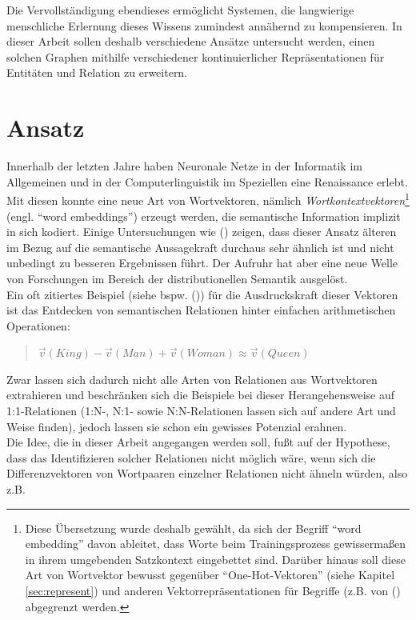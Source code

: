 Die Vervollständigung ebendieses ermöglicht Systemen, die langwierige menschliche Erlernung dieses Wissens zumindest
annähernd zu kompensieren. In dieser Arbeit sollen deshalb verschiedene Ansätze untersucht werden, einen solchen Graphen mithilfe
verschiedener kontinuierlicher Repräsentationen für Entitäten und Relation zu erweitern.

\section{Ansatz}

Innerhalb der letzten Jahre haben Neuronale Netze in der Informatik im Allgemeinen und in der Computerlinguistik im Speziellen
eine Renaissance erlebt. Mit diesen konnte eine neue Art von Wortvektoren, nämlich \emph{Wortkontextvektoren}\footnote{
Diese Übersetzung wurde deshalb gewählt, da sich der Begriff ``word embedding'' davon ableitet, dass Worte beim
Trainingsprozess gewissermaßen in ihrem umgebenden Satzkontext eingebettet sind. Darüber hinaus soll diese Art von Wortvektor
bewusst gegenüber ``One-Hot-Vektoren'' (siehe Kapitel \ref{sec:represent}) und anderen Vektorrepräsentationen für Begriffe
(z.B. von (\cite{bordes2013translating}) abgegrenzt werden.} (engl. ``word embeddings'') erzeugt werden,
die semantische Information implizit in sich kodiert. Einige Untersuchungen wie (\cite{levy2015improving}) zeigen, dass dieser Ansatz älteren
im Bezug auf die semantische Aussagekraft durchaus sehr ähnlich ist und nicht unbedingt zu besseren Ergebnissen führt.
Der Aufruhr hat aber eine neue Welle von Forschungen im Bereich der distributionellen Semantik ausgelöst.\\
Ein oft zitiertes Beispiel (siehe bspw. (\cite{levy2014linguistic})) für die Ausdruckskraft dieser Vektoren ist das Entdecken von
semantischen Relationen hinter einfachen arithmetischen Operationen:

\begin{quote}
  $\vec{v}(King) - \vec{v}(Man) + \vec{v}(Woman) \approx \vec{v}(Queen)$
\end{quote}

Zwar lassen sich dadurch nicht alle Arten von Relationen aus Wortvektoren extrahieren und beschränken sich die Beispiele
bei dieser Herangehensweise auf 1:1-Relationen (1:N-, N:1- sowie N:N-Relationen lassen sich auf andere Art und Weise finden),
jedoch lassen sie schon ein gewisses Potenzial erahnen. \\
Die Idee, die in dieser Arbeit angegangen werden soll, fußt auf der Hypothese, dass das Identifizieren solcher Relationen nicht
möglich wäre, wenn sich die Differenzvektoren von Wortpaaren einzelner Relationen nicht ähneln würden, also z.B.

